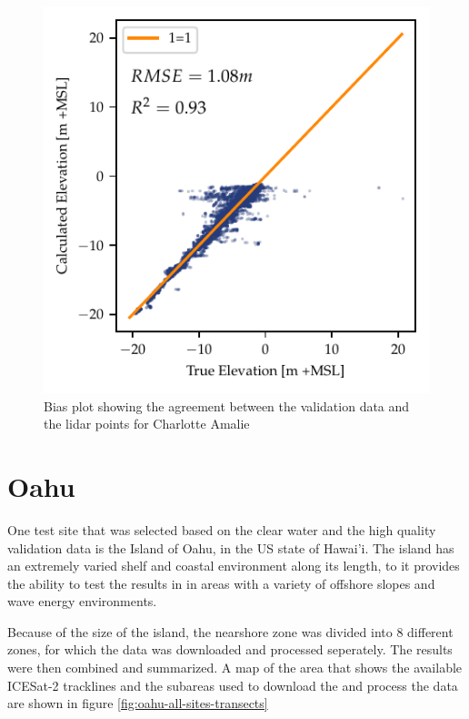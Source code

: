 \begin{figure}[h]
    \centering
    \includegraphics{figures/charlotteamalie_lidar_estimated_vs_truth.pdf}
    \caption{Bias plot showing the agreement between the validation data and the lidar points for Charlotte Amalie}
    \label{fig:charlotteamalie-lidar-bias}
\end{figure}


\section{Oahu}
One test site that was selected based on the clear water and the high quality validation data is the Island of Oahu, in the US state of Hawai'i. The island has an extremely varied shelf and coastal environment along its length, to it provides the ability to test the results in in areas with a variety of offshore slopes and wave energy environments.

Because of the size of the island, the nearshore zone was divided into 8 different zones, for which the data was downloaded and processed seperately. The results were then combined and summarized. A map of the area that shows the available ICESat-2 tracklines and the subareas used to download the and process the data are shown in figure \ref{fig:oahu-all-sites-transects}

